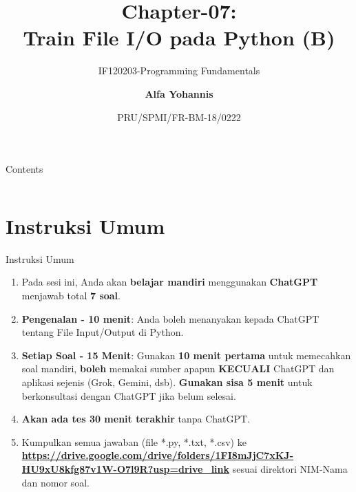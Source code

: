\documentclass[aspectratio=169, table]{beamer}
\subtitle{IF120203-Programming Fundamentals}
\title{Chapter-07:\\\LARGE{Train File I/O pada Python (B)\\}
\vspace{10pt}}
\date[Serial]{\scriptsize {PRU/SPMI/FR-BM-18/0222}}
\author[Pradita]{\small{\textbf{Alfa Yohannis}}}
\begin{document}
\frame{\titlepage}

\begin{frame}[fragile]{Contents}
\vspace{15pt}
\begin{columns}[t]
\begin{column}{.4\textwidth}
\tableofcontents[sections={1-4}]
\end{column}
\begin{column}{.6\textwidth}
\tableofcontents[sections={5-99}]
\end{column}
\end{columns}
\end{frame}

\section{Instruksi Umum}
\begin{frame}[fragile]{Instruksi Umum}
\vspace{20pt}
\begin{enumerate}
\item Pada sesi ini, Anda akan \textbf{belajar mandiri} menggunakan \textbf{ChatGPT} menjawab total \textbf{7 soal}.
\item \textbf{Pengenalan - 10 menit}: Anda boleh menanyakan kepada ChatGPT tentang File Input/Output di Python.
\item \textbf{Setiap Soal - 15 Menit}: Gunakan \textbf{10 menit pertama} untuk memecahkan soal mandiri, \textbf{boleh} memakai sumber apapun \textbf{KECUALI} ChatGPT dan aplikasi sejenis (Grok, Gemini, dsb). \textbf{Gunakan sisa 5 menit} untuk berkonsultasi dengan ChatGPT jika belum selesai. 
\item \textbf{Akan ada tes 30 menit terakhir} tanpa ChatGPT.
\item Kumpulkan semua jawaban (file *.py, *.txt, *.csv) ke \textcolor{blue}{\textbf{\url{https://drive.google.com/drive/folders/1FI8mJjC7xKJ-HU9xU8kfg87v1W-O7l9R?usp=drive_link}}} sesuai direktori NIM-Nama dan nomor soal. 
\end{enumerate}
\end{frame}
\end{document}
